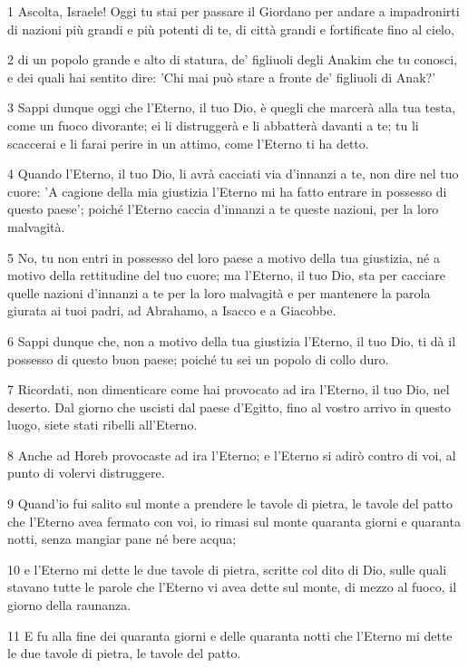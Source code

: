 \par 1 Ascolta, Israele! Oggi tu stai per passare il Giordano per andare a impadronirti di nazioni più grandi e più potenti di te, di città grandi e fortificate fino al cielo,
\par 2 di un popolo grande e alto di statura, de' figliuoli degli Anakim che tu conosci, e dei quali hai sentito dire: 'Chi mai può stare a fronte de' figliuoli di Anak?'
\par 3 Sappi dunque oggi che l'Eterno, il tuo Dio, è quegli che marcerà alla tua testa, come un fuoco divorante; ei li distruggerà e li abbatterà davanti a te; tu li scaccerai e li farai perire in un attimo, come l'Eterno ti ha detto.
\par 4 Quando l'Eterno, il tuo Dio, li avrà cacciati via d'innanzi a te, non dire nel tuo cuore: 'A cagione della mia giustizia l'Eterno mi ha fatto entrare in possesso di questo paese'; poiché l'Eterno caccia d'innanzi a te queste nazioni, per la loro malvagità.
\par 5 No, tu non entri in possesso del loro paese a motivo della tua giustizia, né a motivo della rettitudine del tuo cuore; ma l'Eterno, il tuo Dio, sta per cacciare quelle nazioni d'innanzi a te per la loro malvagità e per mantenere la parola giurata ai tuoi padri, ad Abrahamo, a Isacco e a Giacobbe.
\par 6 Sappi dunque che, non a motivo della tua giustizia l'Eterno, il tuo Dio, ti dà il possesso di questo buon paese; poiché tu sei un popolo di collo duro.
\par 7 Ricordati, non dimenticare come hai provocato ad ira l'Eterno, il tuo Dio, nel deserto. Dal giorno che uscisti dal paese d'Egitto, fino al vostro arrivo in questo luogo, siete stati ribelli all'Eterno.
\par 8 Anche ad Horeb provocaste ad ira l'Eterno; e l'Eterno si adirò contro di voi, al punto di volervi distruggere.
\par 9 Quand'io fui salito sul monte a prendere le tavole di pietra, le tavole del patto che l'Eterno avea fermato con voi, io rimasi sul monte quaranta giorni e quaranta notti, senza mangiar pane né bere acqua;
\par 10 e l'Eterno mi dette le due tavole di pietra, scritte col dito di Dio, sulle quali stavano tutte le parole che l'Eterno vi avea dette sul monte, di mezzo al fuoco, il giorno della raunanza.
\par 11 E fu alla fine dei quaranta giorni e delle quaranta notti che l'Eterno mi dette le due tavole di pietra, le tavole del patto.
